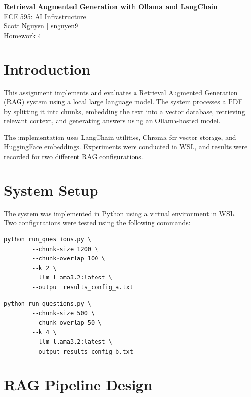 \documentclass[11pt]{article}
\begin{document}
	
	\begin{center}
		{\Large \textbf{Retrieval Augmented Generation with Ollama and LangChain}}\\[0.3em]
		{\large ECE 595: AI Infrastructure}\\[0.3em]
		{\large Scott Nguyen | snguyen9}\\[0.3em]
		{\large Homework 4}
	\end{center}
	
	\vspace{1em}
	
	\section{Introduction}
	
	This assignment implements and evaluates a Retrieval Augmented Generation (RAG) system using a local large language model. The system processes a PDF by splitting it into chunks, embedding the text into a vector database, retrieving relevant context, and generating answers using an Ollama-hosted model.
	
	The implementation uses LangChain utilities, Chroma for vector storage, and HuggingFace embeddings. Experiments were conducted in WSL, and results were recorded for two different RAG configurations.
	
	\section{System Setup}
	
	The system was implemented in Python using a virtual environment in WSL. Two configurations were tested using the following commands:
	
	\begin{lstlisting}[style=terminal, caption={Configuration A run command}]
		python run_questions.py \
		--chunk-size 1200 \
		--chunk-overlap 100 \
		--k 2 \
		--llm llama3.2:latest \
		--output results_config_a.txt
	\end{lstlisting}
	
	\begin{lstlisting}[style=terminal, caption={Configuration B run command}]
		python run_questions.py \
		--chunk-size 500 \
		--chunk-overlap 50 \
		--k 4 \
		--llm llama3.2:latest \
		--output results_config_b.txt
	\end{lstlisting}
	
	\section{RAG Pipeline Design}
	
\end{document}
